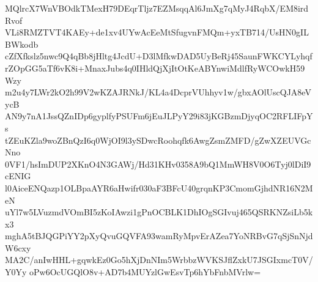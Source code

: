 MQlrcX7WnVBOdkTMexH79DEqrTljz7EZMsqqAl6JmXg7qMyJ4RqbX/EM8irdRvof
VLi8RMZTVT4KAEy+de1xv4UYwAcEeMtSfugvnFMQm+yxTB714/UsHN0gILBWkodb
cZfXfkslz5nwc9Q4qBb8jHltg4JcdU+D3lMfkwDAD5UyBeRj45SaunFWKCYLyhqf
rZOpGG5aTf6vK8i+MnaxJubs4q0IHldQjXjItOtKeABYnwiMdlfRyWCOwkH59Wzy
m2u4y7LWr2kO2h99V2wKZAJRNkJ/KL4a4DcprVUhhyv1w/gbxAOlUscQJA8eVycB
AN9y7nA1JssQZnIDp6gyplfyPSUFm6jEuJLPyY29i83jKGBzmDjyqOC2RFLIFpYs
tZEuKZla9woZBnQzI6q0WjOI9l3ySDwcRoohqfk6AwgZsmZMFD/gZwXZEUVGcNno
0VF1/hsImDUP2XKnO4N3GAWj/Hd31KHv0358A9bQ1MmWH8V0O6Tyj0lDiI9cENIG
l0AiceENQazp1OLBpaAYR6aHwifr030aF3BFcU40grqnKP3CmomGjhdNR16N2MeN
uYl7w5LVuzmdVOmBI5zKoIAwzi1gPnOCBLK1DhIOgSGIvuj465QSRKNZsiLb5kx3
mghA5tBJQGPiYY2pXyQvuGQVFA93wamRyMpvErAZea7YoNRBvG7qSjSnNjdW6cxy
MA2C/anIwHHL+gqwkEz0Go5hXjDnNIm5WrbbzWVKSJflZxkU7JSGIxmcT0V/Y0Yy
oPw6OcUGQlO8v+AD7b4MUYzlGwEsvTp6hYbFnbMVrlw=
